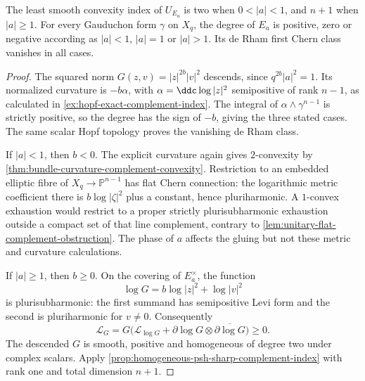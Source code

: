 \begin{example}\label{ex:hopf-all-automorphy-complement-index}
The least smooth convexity index of $U_{E_a}$ is two when $0<|a|<1$, and $n+1$ when $|a|\geq1$. For every Gauduchon form $\gamma$ on $X_q$, the degree of $E_a$ is positive, zero or negative according as $|a|<1$, $|a|=1$ or $|a|>1$. Its de Rham first Chern class vanishes in all cases.
\end{example}
\begin{proof}
The squared norm $G(z,v)=|z|^{2b}|v|^2$ descends, since $q^{2b}|a|^2=1$. Its normalized curvature is $-b\alpha$, with $\alpha=\ddc\log|z|^2$ semipositive of rank $n-1$, as calculated in \cref{ex:hopf-exact-complement-index}. The integral of $\alpha\wedge\gamma^{n-1}$ is strictly positive, so the degree has the sign of $-b$, giving the three stated cases. The same scalar Hopf topology proves the vanishing de Rham class.

If $|a|<1$, then $b<0$. The explicit curvature again gives $2$-convexity by \cref{thm:bundle-curvature-complement-convexity}. Restriction to an embedded elliptic fibre of $X_q\to\mathbb P^{n-1}$ has flat Chern connection: the logarithmic metric coefficient there is $b\log|\zeta|^2$ plus a constant, hence pluriharmonic. A $1$-convex exhaustion would restrict to a proper strictly plurisubharmonic exhaustion outside a compact set of that line complement, contrary to \cref{lem:unitary-flat-complement-obstruction}. The phase of $a$ affects the gluing but not these metric and curvature calculations.

If $|a|\geq1$, then $b\geq0$. On the covering of $E_a^\times$, the function
\[
 \log G=b\log|z|^2+\log|v|^2
\]
is plurisubharmonic: the first summand has semipositive Levi form and the second is pluriharmonic for $v\ne0$. Consequently
\[
 \mathcal L_G=G\bigl(\mathcal L_{\log G}+\partial\log G\otimes\overline{\partial\log G}\bigr)\geq0.
\]
The descended $G$ is smooth, positive and homogeneous of degree two under complex scalars. Apply \cref{prop:homogeneous-psh-sharp-complement-index} with rank one and total dimension $n+1$.
\end{proof}
